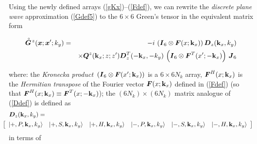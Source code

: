 Using the newly defined arrays (\ref{gKx})--(\ref{Fdef}),
we can  rewrite the {\em discrete plane wave\/} 
approximation (\ref{Gdef5}) to the $6 \times 6$ Green's tensor in the equivalent matrix 
form
\begin{samepage}
\begin{eqnarray} \label{superG}
\stackrel{\scriptscriptstyle _{\,\,\circ}}{ \mbox{\boldmath$\mit G$\unboldmath}}\!{}^{z}({\mbox{\boldmath$\mit x$\unboldmath}};{\mbox{\boldmath$\mit x$\unboldmath}}^{\prime};k_y)
&=&- i\,\left({\mbox{\boldmath$\mit I$\unboldmath}}_6\otimes 
{\mbox{\boldmath$\mit F$\unboldmath}}(x;{\bf k}_{x})  \right) {\mbox{\boldmath$\mit D$\unboldmath}}_{z}({\bf k}_{x},{k}_{y})\nonumber\\
&& \times
{\mbox{\boldmath$\mit Q$\unboldmath}}^{z}({\bf k}_{x};z;z^{\prime}){\mbox{\boldmath$\mit D$\unboldmath}}_{z}^{T}(-{\bf k}_{x},-{k}_{y})
\,\left({\mbox{\boldmath$\mit I$\unboldmath}}_6\otimes {\mbox{\boldmath$\mit F$\unboldmath}}^{T}(x^{\prime};-{\bf k}_{x})  \right)\,{\mbox{\boldmath$\mit J$\unboldmath}}_6
\end{eqnarray} 
\end{samepage}
where:\newline
the {\em Kronecka product\/}
$\,\left({\mbox{\boldmath$\mit I$\unboldmath}}_6\otimes {\mbox{\boldmath$\mit F$\unboldmath}}(x^{\prime};{\bf k}_{x})  \right)$ is 
a $  6 \times 6 N_k$ array, 
${\mbox{\boldmath$\mit F$\unboldmath}}^{H}(x;{\bf k}_{x})$ is the {\em Hermitian transpose\/} of the 
Fourier vector ${\mbox{\boldmath$\mit F$\unboldmath}}(x;{\bf k}_{x})$ defined in (\ref{Fdef})
(so that ${\mbox{\boldmath$\mit F$\unboldmath}}^{H}(x;{\bf k}_{x})\equiv {\mbox{\boldmath$\mit F$\unboldmath}}^{T}(x;-{\bf 
k}_{x})$);\newline
 the $(6N_k)\times (6N_k)$ matrix analogue of (\ref{Ddef}) is defined 
as
\begin{eqnarray} \label{Dsuperdef}
\lefteqn{{\bmi D}_{z}({\bf k}_{x},k_{y})=}\\
&&\!\!\!\!\!\!\!\!\!\!\!\!
\left[\begin{array}{cccccc}
\left|+,P, {\bf k}_{x},k_{y}  \right\rangle&\left|+,S, {\bf k}_{x},k_{y}  
\right\rangle&\left|+,H, {\bf k}_{x},k_{y}  \right\rangle&
\left|-,P, {\bf k}_{x},k_{y}  \right\rangle&\left|-,S, {\bf k}_{x},k_{y}  
\right\rangle&\left|-,H, {\bf k}_{x},k_{y}  \right\rangle
\end{array}\right]\nonumber
\end{eqnarray}
in terms of
